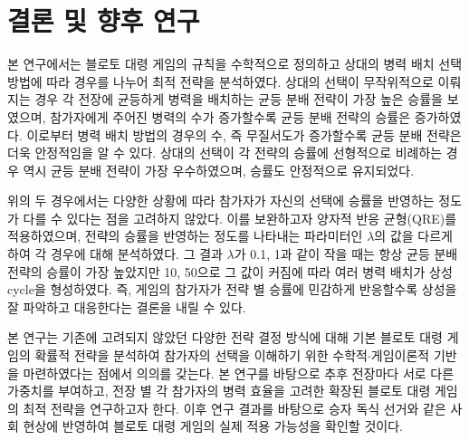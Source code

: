 \section{결론 및 향후 연구}

본 연구에서는 블로토 대령 게임의 규칙을 수학적으로 정의하고 상대의 병력 배치 선택 방법에 따라 경우를 나누어 최적 전략을 분석하였다. 상대의 선택이 무작위적으로 이뤄지는 경우 각 전장에 균등하게 병력을 배치하는 균등 분배 전략이 가장 높은 승률을 보였으며, 참가자에게 주어진 병력의 수가 증가할수록 균등 분배 전략의 승률은 증가하였다. 이로부터 병력 배치 방법의 경우의 수, 즉 무질서도가 증가할수록 균등 분배 전략은 더욱 안정적임을 알 수 있다. 상대의 선택이 각 전략의 승률에 선형적으로 비례하는 경우 역시 균등 분배 전략이 가장 우수하였으며, 승률도 안정적으로 유지되었다.

위의 두 경우에서는 다양한 상황에 따라 참가자가 자신의 선택에 승률을 반영하는 정도가 다를 수 있다는 점을 고려하지 않았다. 이를 보완하고자 양자적 반응 균형(QRE)를 적용하였으며, 전략의 승률을 반영하는 정도를 나타내는 파라미터인 $\lambda$의 값을 다르게 하여 각 경우에 대해 분석하였다. 그 결과 $\lambda$가 0.1, 1과 같이 작을 때는 항상 균등 분배 전략의 승률이 가장 높았지만 10, 50으로 그 값이 커짐에 따라 여러 병력 배치가 상성 cycle을 형성하였다. 즉, 게임의 참가자가 전략 별 승률에 민감하게 반응할수록 상성을 잘 파악하고 대응한다는 결론을 내릴 수 있다.

본 연구는 기존에 고려되지 않았던 다양한 전략 결정 방식에 대해 기본 블로토 대령 게임의 확률적 전략을 분석하여 참가자의 선택을 이해하기 위한 수학적$\cdot$게임이론적 기반을 마련하였다는 점에서 의의를 갖는다. 본 연구를 바탕으로 추후 전장마다 서로 다른 가중치를 부여하고, 전장 별 각 참가자의 병력 효율을 고려한 확장된 블로토 대령 게임의 최적 전략을 연구하고자 한다. 이후 연구 결과를 바탕으로 승자 독식 선거와 같은 사회 현상에 반영하여 블로토 대령 게임의 실제 적용 가능성을 확인할 것이다.